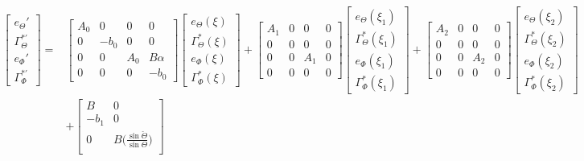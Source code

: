 \documentclass[main.tex]{subfiles}
\begin{document}
	\begin{align}
		\begin{bmatrix}
		e_\Theta' \\
		\Gamma_\Theta^{*'} \\
		e_\Phi' \\
		\Gamma_\Phi^{*'}
		\end{bmatrix} =&
		\begin{bmatrix}
		A_0 & 0 & 0 & 0\\
		0 & -b_0 & 0 & 0 \\
		0 & 0 & A_0 & B \alpha \\
		0 & 0 & 0 & -b_0
		\end{bmatrix}
		\begin{bmatrix}
		e_\Theta(\xi) \\
		\Gamma_\Theta^{*} (\xi) \\
		e_\Phi(\xi) \\
		\Gamma_\Phi^{*} (\xi) 
		\end{bmatrix} + 
		\begin{bmatrix}
		A_1 & 0 & 0 & 0\\
		0 & 0 & 0 & 0 \\
		0 & 0 & A_1 & 0 \\
		0 & 0 & 0 & 0 
		\end{bmatrix}
		\begin{bmatrix}
		e_\Theta(\xi_1) \\
		\Gamma_\Theta^{*} (\xi_1) \\
		e_\Phi(\xi_1) \\
		\Gamma_\Phi^{*} (\xi_1) 
		\end{bmatrix} +
		\begin{bmatrix}
		A_2 & 0 & 0 & 0\\
		0 & 0 & 0 & 0 \\
		0 & 0 & A_2 & 0 \\
		0 & 0 & 0 & 0 
		\end{bmatrix}
		\begin{bmatrix}
		e_\Theta(\xi_2) \\
		\Gamma_\Theta^{*} (\xi_2) \\
		e_\Phi(\xi_2) \\
		\Gamma_\Phi^{*} (\xi_2) 
		\end{bmatrix} \nonumber\\
		 &+ \begin{bmatrix}
		 B & 0 \\
		 -b_1 & 0 \\
		 0 & B\bigg( \frac{\sin \check{\Theta}}{\sin \Theta}\bigg) \\

\end{bmatrix}
\end{align}
\end{document}
